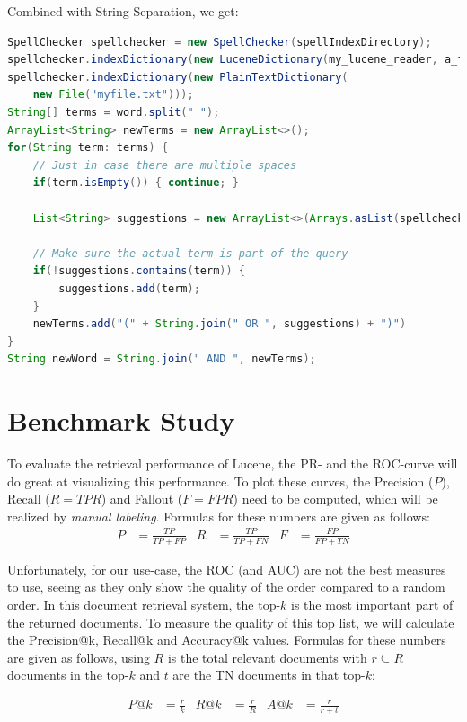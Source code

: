 \documentclass[11pt]{article}
\begin{document}
Combined with \textsf{String Separation}, we get:
\begin{lstlisting}[language=Java]
SpellChecker spellchecker = new SpellChecker(spellIndexDirectory);
spellchecker.indexDictionary(new LuceneDictionary(my_lucene_reader, a_field));
spellchecker.indexDictionary(new PlainTextDictionary(
    new File("myfile.txt")));
String[] terms = word.split(" ");
ArrayList<String> newTerms = new ArrayList<>();
for(String term: terms) {
    // Just in case there are multiple spaces
    if(term.isEmpty()) { continue; }
    
    List<String> suggestions = new ArrayList<>(Arrays.asList(spellchecker.suggestSimilar(term, 5));
    
    // Make sure the actual term is part of the query
    if(!suggestions.contains(term)) {
        suggestions.add(term);
    }
    newTerms.add("(" + String.join(" OR ", suggestions) + ")")
}
String newWord = String.join(" AND ", newTerms);
\end{lstlisting}

\section{Benchmark Study}\label{sec:bstudy}
To evaluate the retrieval performance of Lucene, the PR- and the ROC-curve will do great at visualizing this performance. To plot these curves, the Precision ($P$), Recall ($R = TPR$) and Fallout ($F = FPR$) need to be computed, which will be realized by \textit{manual labeling}. Formulas for these numbers are given as follows:
\begin{align*}
    P &= \frac{TP}{TP+FP}&
    R &= \frac{TP}{TP+FN}&
    F &= \frac{FP}{FP+TN}
\end{align*}

Unfortunately, for our use-case, the ROC (and AUC) are not the best measures to use, seeing as they only show the quality of the order compared to a random order. In this document retrieval system, the top-$k$ is the most important part of the returned documents. To measure the quality of this top list, we will calculate the \textsf{Precision@k}, \textsf{Recall@k} and \textsf{Accuracy@k} values. Formulas for these numbers are given as follows, using $R$ is the total relevant documents with $r \subseteq R$ documents in the top-$k$ and $t$ are the TN documents in that top-$k$:

\begin{align*}
P@k &= \frac{r}{k}&
R@k &= \frac{r}{R}&
A@k &= \frac{r}{r+t}
\end{align*}
\end{document}
